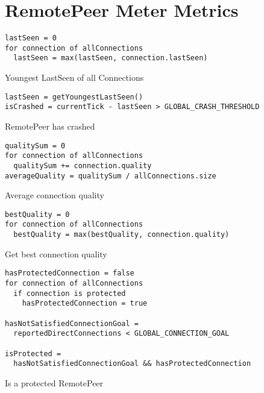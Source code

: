 \section{RemotePeer Meter Metrics}
\begin{Listing}[H]
\begin{lstlisting}[xleftmargin=3em]
lastSeen = 0
for connection of allConnections
  lastSeen = max(lastSeen, connection.lastSeen)
\end{lstlisting}
\caption{Youngest LastSeen of all Connections}
\label{lst:mit-last-seen}
\end{Listing}

\begin{Listing}[H]
\begin{lstlisting}[xleftmargin=3em]
lastSeen = getYoungestLastSeen()
isCrashed = currentTick - lastSeen > GLOBAL_CRASH_THRESHOLD
\end{lstlisting}
\caption{RemotePeer has crashed}
\label{lst:mit-crashed}
\end{Listing}

\begin{Listing}[H]
\begin{lstlisting}[xleftmargin=3em]
qualitySum = 0
for connection of allConnections
  qualitySum += connection.quality
averageQuality = qualitySum / allConnections.size  
\end{lstlisting}
\caption{Average connection quality}
\label{lst:mit-average-connection-quality}
\end{Listing}

\begin{Listing}[H]
\begin{lstlisting}[xleftmargin=3em]
bestQuality = 0
for connection of allConnections
  bestQuality = max(bestQuality, connection.quality)
\end{lstlisting}
\caption{Get best connection quality}
\label{lst:mit-best-connection-quality}
\end{Listing}

\begin{Listing}[H]
\begin{lstlisting}[xleftmargin=3em]
hasProtectedConnection = false
for connection of allConnections
  if connection is protected
    hasProtectedConnection = true
    
hasNotSatisfiedConnectionGoal = 
  reportedDirectConnections < GLOBAL_CONNECTION_GOAL 

isProtected = 
  hasNotSatisfiedConnectionGoal && hasProtectedConnection  
\end{lstlisting}
\caption{Is a protected RemotePeer}
\label{lst:mit-welpenschutz}
\end{Listing}

